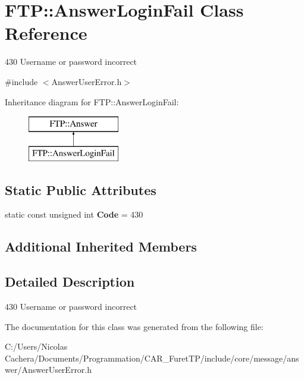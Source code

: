 \hypertarget{classFTP_1_1AnswerLoginFail}{}\section{F\+T\+P\+:\+:Answer\+Login\+Fail Class Reference}
\label{classFTP_1_1AnswerLoginFail}


430 Username or password incorrect  




{\ttfamily \#include $<$Answer\+User\+Error.\+h$>$}

Inheritance diagram for F\+T\+P\+:\+:Answer\+Login\+Fail\+:\begin{figure}[H]
\begin{center}
\leavevmode
\includegraphics[height=2.000000cm]{classFTP_1_1AnswerLoginFail}
\end{center}
\end{figure}
\subsection*{Static Public Attributes}
\begin{DoxyCompactItemize}
\item 
\hypertarget{classFTP_1_1AnswerLoginFail_add2a45cb80065adb45244ffd47b10ce5}{}static const unsigned int {\bfseries Code} = 430\label{classFTP_1_1AnswerLoginFail_add2a45cb80065adb45244ffd47b10ce5}

\end{DoxyCompactItemize}
\subsection*{Additional Inherited Members}


\subsection{Detailed Description}
430 Username or password incorrect 

The documentation for this class was generated from the following file\+:\begin{DoxyCompactItemize}
\item 
C\+:/\+Users/\+Nicolas Cachera/\+Documents/\+Programmation/\+C\+A\+R\+\_\+\+Furet\+T\+P/include/core/message/answer/Answer\+User\+Error.\+h\end{DoxyCompactItemize}
